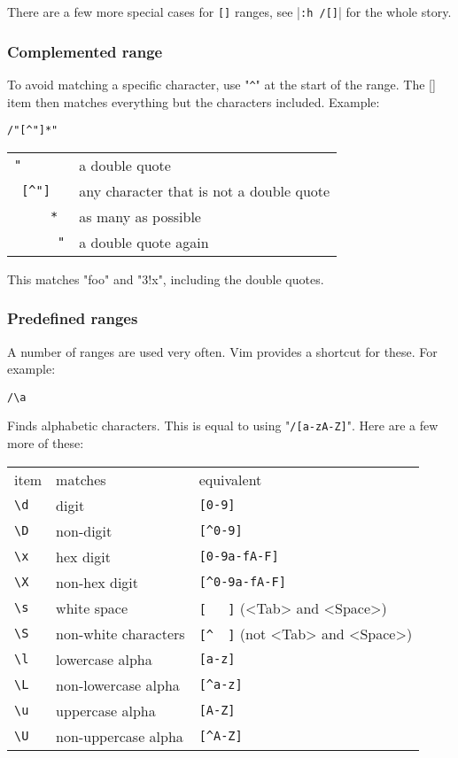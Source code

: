 There are a few more special cases for \verb![]! ranges, see |\verb!:h /[]!| for the whole story.
\subsubsection{Complemented range}
To avoid matching a specific character, use "\verb!^!" at the start of the range.
The [] item then matches everything but the characters included.
Example:

\begin{Verbatim}[samepage=true]
 /"[^"]*"
\end{Verbatim}

\begin{center} \begin{tabular}{l l}
				\verb!"      ! & a double quote \\
				\verb! [^"]  ! & any character that is not a double quote \\
				\verb!     * ! & as many as possible \\
				\verb!      "! & a double quote again \\
\end{tabular} \end{center}

This matches "foo" and "3!x", including the double quotes.
\subsubsection{Predefined ranges}
A number of ranges are used very often.
Vim provides a shortcut for these.
For example:

\begin{Verbatim}[samepage=true]
 /\a
\end{Verbatim}

Finds alphabetic characters.
This is equal to using "\verb!/[a-zA-Z]!".
Here are a few more of these:

\begin{center} \begin{tabular}{l l l}
				item & matches & equivalent \\
				\verb!\d! & digit & \verb![0-9]!\\
				\verb!\D! & non-digit & \verb![^0-9]!\\
				\verb!\x! & hex digit & \verb![0-9a-fA-F]!\\
				\verb!\X! & non-hex digit & \verb![^0-9a-fA-F]!\\
				\verb!\s! & white space & \verb![   ]! (<Tab> and <Space>)\\
				\verb!\S! & non-white characters & \verb![^  ]! (not <Tab> and <Space>)\\
				\verb!\l! & lowercase alpha & \verb![a-z]!\\
				\verb!\L! & non-lowercase alpha & \verb![^a-z]!\\
				\verb!\u! & uppercase alpha & \verb![A-Z]!\\
				\verb!\U! & non-uppercase alpha & \verb![^A-Z]!\\
\end{tabular} \end{center}

